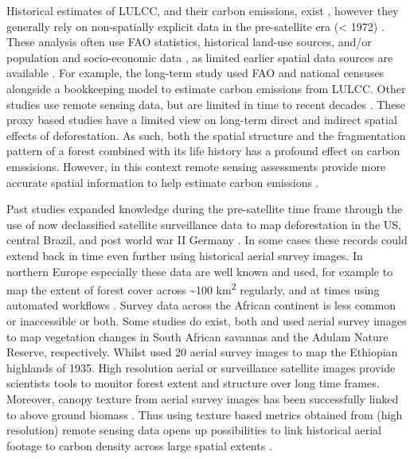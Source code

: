 \documentclass[remote sensing,article,submit,moreauthors,pdftex,10pt,a4paper]{mdpi}
\begin{document}
Historical estimates of LULCC, and their carbon emissions, exist
\citep{houghton2012, ramankutty1999, defries2002, sader1988}, however
they generally rely on non-spatially explicit data in the pre-satellite
era (\textless{} 1972) \citep{houghton2010}. These analysis often use
FAO statistics, historical land-use sources, and/or population and
socio-economic data \citep{houghton2012}, as limited earlier spatial
data sources are available \citep{hansen2013, achard2014}. For example,
the \citet{houghton2010} long-term study used FAO and national censuses
alongside a bookkeeping model to estimate carbon emissions from LULCC.
Other studies use remote sensing data, but are limited in time to recent
decades \citep{defries2002, houghton2012}. These proxy based studies
have a limited view on long-term direct and indirect spatial effects of
deforestation. As such, both the spatial structure and the fragmentation
pattern of a forest combined with its life history has a profound effect
on carbon emssisions. However, in this context remote sensing
assessments provide more accurate spatial information to help estimate
carbon emissions \citep{mitchard2018}.

Past studies expanded knowledge during the pre-satellite time frame
through the use of now declassified satellite surveillance data to map
deforestation in the US, central Brazil, and post world war II Germany
\citep{song2015, nita2018}. In some cases these records could extend
back in time even further using historical aerial survey images. In
northern Europe especially these data are well known and used, for
example to map the extent of forest cover across \textasciitilde{}100
km\textsuperscript{2} regularly, and at times using automated workflows
\citep{giordano2018}. Survey data across the African continent is less
common or inaccessible or both. Some studies do exist, both
\citet{buitenwerf2012} and \citet{okeke2006} used aerial survey images
to map vegetation changes in South African savannas and the Adulam
Nature Reserve, respectively. Whilst \citet{frankl2015} used 20 aerial
survey images to map the Ethiopian highlands of 1935. High resolution
aerial or surveillance satellite images provide scientists tools to
monitor forest extent and structure over long time frames. Moreover,
canopy texture from aerial survey images has been successfully linked to
above ground biomass \citep{Ploton2012, Couteron2005, Barbier2010}. Thus
using texture based metrics obtained from (high resolution) remote
sensing data opens up possibilities to link historical aerial footage to
carbon density across large spatial extents \citep{Couteron2005}.
\end{document}
